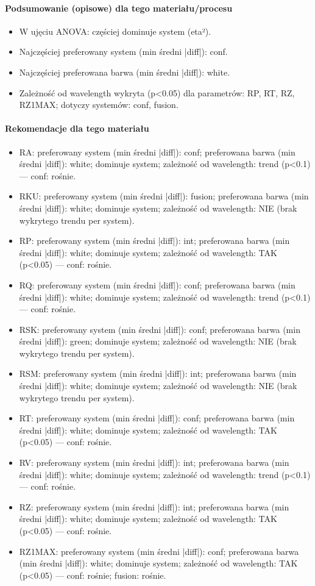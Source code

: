 \documentclass[
  10pt,
]{article}
\begin{document}
\paragraph{Podsumowanie (opisowe) dla tego materiału/procesu}
\begin{itemize}
\item W ujęciu ANOVA: częściej dominuje system (eta²).
\item Najczęściej preferowany system (min średni |diff|): conf.
\item Najczęściej preferowana barwa (min średni |diff|): white.
\item Zależność od wavelength wykryta (p<0.05) dla parametrów: RP, RT, RZ, RZ1MAX; dotyczy systemów: conf, fusion.
\end{itemize}
\paragraph{Rekomendacje dla tego materiału}
\begin{itemize}
\item RA: preferowany system (min średni |diff|): conf; preferowana barwa (min średni |diff|): white; dominuje system; zależność od wavelength: trend (p<0.1) — conf: rośnie.
\item RKU: preferowany system (min średni |diff|): fusion; preferowana barwa (min średni |diff|): white; dominuje system; zależność od wavelength: NIE (brak wykrytego trendu per system).
\item RP: preferowany system (min średni |diff|): int; preferowana barwa (min średni |diff|): white; dominuje system; zależność od wavelength: TAK (p<0.05) — conf: rośnie.
\item RQ: preferowany system (min średni |diff|): conf; preferowana barwa (min średni |diff|): white; dominuje system; zależność od wavelength: trend (p<0.1) — conf: rośnie.
\item RSK: preferowany system (min średni |diff|): conf; preferowana barwa (min średni |diff|): green; dominuje system; zależność od wavelength: NIE (brak wykrytego trendu per system).
\item RSM: preferowany system (min średni |diff|): int; preferowana barwa (min średni |diff|): white; dominuje system; zależność od wavelength: NIE (brak wykrytego trendu per system).
\item RT: preferowany system (min średni |diff|): conf; preferowana barwa (min średni |diff|): white; dominuje system; zależność od wavelength: TAK (p<0.05) — conf: rośnie.
\item RV: preferowany system (min średni |diff|): int; preferowana barwa (min średni |diff|): white; dominuje system; zależność od wavelength: trend (p<0.1) — conf: rośnie.
\item RZ: preferowany system (min średni |diff|): int; preferowana barwa (min średni |diff|): white; dominuje system; zależność od wavelength: TAK (p<0.05) — conf: rośnie.
\item RZ1MAX: preferowany system (min średni |diff|): conf; preferowana barwa (min średni |diff|): white; dominuje system; zależność od wavelength: TAK (p<0.05) — conf: rośnie; fusion: rośnie.
\end{itemize}
\end{document}

